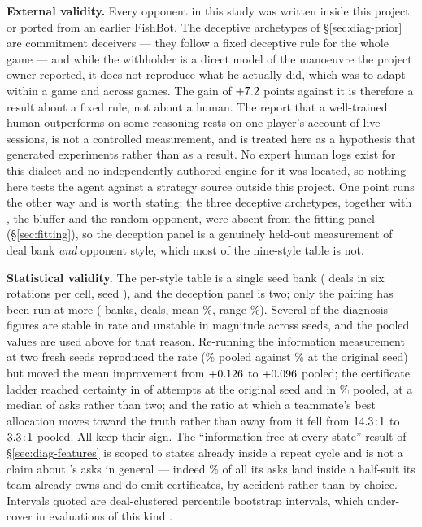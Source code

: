 \textbf{External validity.} Every opponent in this study was written inside this
project or ported from an earlier FishBot. The deceptive archetypes of
\S\ref{sec:diag-prior} are commitment deceivers --- they follow a fixed deceptive
rule for the whole game --- and while the withholder is a direct model of the
manoeuvre the project owner reported, it does not reproduce what he actually
did, which was to adapt within a game and across games. The gain of
$+7.2$ points against it is therefore a result about a fixed
rule, not about a human. The report that a well-trained human outperforms
\vfour{} on some reasoning rests on one player's account of live sessions, is not
a controlled measurement, and is treated here as a hypothesis that generated
experiments rather than as a result. No expert human logs exist for this dialect
and no independently authored engine for it was located, so nothing here tests
the agent against a strategy source outside this project. One point runs the
other way and is worth stating: the three deceptive archetypes, together with
\vtwo{}, the bluffer and the random opponent, were absent from the fitting panel
(\S\ref{sec:fitting}), so the deception panel is a genuinely held-out
measurement of deal bank \emph{and} opponent style, which most of the nine-style
table is not.

\textbf{Statistical validity.} The per-style table is a single seed bank
(\numStyleDeals{} deals in six rotations per cell, seed \numStyleSeed{}), and the
deception panel is two; only the \vfour{} pairing has been run at more
(\numHeadSeeds{} banks, \numHeadDeals{} deals, mean \numHeadWin\%, range
\numHeadRange\%). Several of the diagnosis figures are stable in rate and
unstable in magnitude across seeds, and the pooled values are used above for that
reason. Re-running the information measurement at two fresh seeds reproduced the
rate (\numCertRate\% pooled against \numCertRateOrig\% at the original seed) but
moved the mean improvement from $+0.126$ to $+0.096$ pooled;
the certificate ladder reached certainty in \numLadderOrigN{} of
\numLadderOrigN{} attempts at the original seed and in \numLadderRate\% pooled,
at a median of \numLadderMedian{} asks rather than two; and the ratio at which a
teammate's best allocation moves toward the truth rather than away from it fell
from $14.3\!:\!1$ to $3.3\!:\!1$ pooled. All keep
their sign. The ``information-free at every state'' result of
\S\ref{sec:diag-features} is scoped to \numInfoFreeStates{} states already inside
a repeat cycle and is not a claim about \vfour{}'s asks in general --- indeed
\numOwnLocked\% of all its asks land inside a half-suit its team already owns and
do emit certificates, by accident rather than by choice. Intervals quoted are
deal-clustered percentile bootstrap intervals, which under-cover in evaluations
of this kind \cite{jordan-rleval}.

